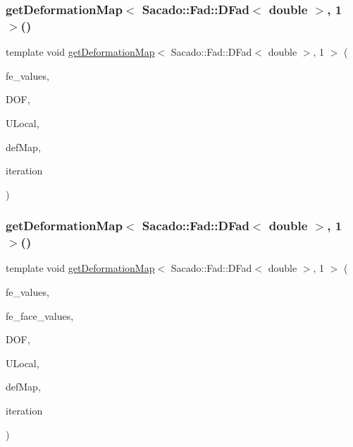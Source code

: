 \subsubsection{\texorpdfstring{get\+Deformation\+Map$<$ Sacado\+::\+Fad\+::\+D\+Fad$<$ double $>$, 1 $>$()}{getDeformationMap< Sacado::Fad::DFad< double >, 1 >()}\hspace{0.1cm}{\footnotesize\ttfamily [1/2]}}
{\footnotesize\ttfamily template void \mbox{\hyperlink{group___evaluation_functions_ga239b206235603af9482484c29c8d57ea}{get\+Deformation\+Map}}$<$ Sacado\+::\+Fad\+::\+D\+Fad$<$ double $>$, 1 $>$ (\begin{DoxyParamCaption}\item[{const F\+E\+Values$<$ 1 $>$ \&}]{fe\+\_\+values,  }\item[{unsigned int}]{D\+OF,  }\item[{Table$<$ 1, Sacado\+::\+Fad\+::\+D\+Fad$<$ double $>$$>$ \&}]{U\+Local,  }\item[{\mbox{\hyperlink{structdeformation_map}{deformation\+Map}}$<$ Sacado\+::\+Fad\+::\+D\+Fad$<$ double $>$, 1 $>$ \&}]{def\+Map,  }\item[{unsigned int}]{iteration }\end{DoxyParamCaption})}

\mbox{\label{function_evaluations_8cc_ae3b81f1c251c883431db31f41eb1c340}} 
\subsubsection{\texorpdfstring{get\+Deformation\+Map$<$ Sacado\+::\+Fad\+::\+D\+Fad$<$ double $>$, 1 $>$()}{getDeformationMap< Sacado::Fad::DFad< double >, 1 >()}\hspace{0.1cm}{\footnotesize\ttfamily [2/2]}}
{\footnotesize\ttfamily template void \mbox{\hyperlink{group___evaluation_functions_ga239b206235603af9482484c29c8d57ea}{get\+Deformation\+Map}}$<$ Sacado\+::\+Fad\+::\+D\+Fad$<$ double $>$, 1 $>$ (\begin{DoxyParamCaption}\item[{const F\+E\+Values$<$ 1 $>$ \&}]{fe\+\_\+values,  }\item[{const F\+E\+Face\+Values$<$ 1 $>$ \&}]{fe\+\_\+face\+\_\+values,  }\item[{unsigned int}]{D\+OF,  }\item[{Table$<$ 1, Sacado\+::\+Fad\+::\+D\+Fad$<$ double $>$$>$ \&}]{U\+Local,  }\item[{\mbox{\hyperlink{structdeformation_map}{deformation\+Map}}$<$ Sacado\+::\+Fad\+::\+D\+Fad$<$ double $>$, 1 $>$ \&}]{def\+Map,  }\item[{unsigned int}]{iteration }\end{DoxyParamCaption})}

